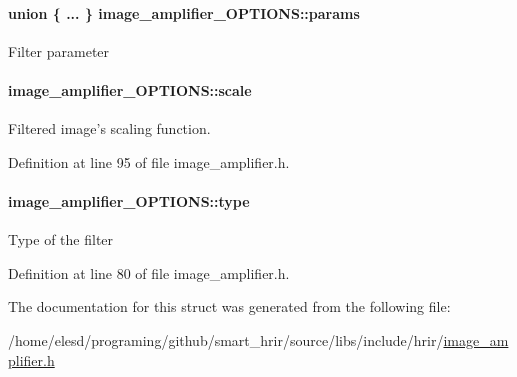 \hypertarget{a00002_ac7c75806a264a52c487659515f68ff31}{
\paragraph[{params}]{\setlength{\rightskip}{0pt plus 5cm}union \{ ... \}   image\-\_\-amplifier\-\_\-\-O\-P\-T\-I\-O\-N\-S\-::params}}\label{a00002_ac7c75806a264a52c487659515f68ff31}
Filter parameter \hypertarget{a00002_a9b180d0032ef65ead5962c570736e423}{
\paragraph[{scale}]{ image\-\_\-amplifier\-\_\-\-O\-P\-T\-I\-O\-N\-S\-::scale}}\label{a00002_a9b180d0032ef65ead5962c570736e423}
Filtered image's scaling function. 

Definition at line 95 of file image\-\_\-amplifier.\-h.

\hypertarget{a00002_a4bc5ec751e2e2013dafc3a6b65e24323}{
\paragraph[{type}]{ image\-\_\-amplifier\-\_\-\-O\-P\-T\-I\-O\-N\-S\-::type}}\label{a00002_a4bc5ec751e2e2013dafc3a6b65e24323}
Type of the filter 

Definition at line 80 of file image\-\_\-amplifier.\-h.



The documentation for this struct was generated from the following file\-:\begin{DoxyCompactItemize}
\item 
/home/elesd/programing/github/smart\-\_\-hrir/source/libs/include/hrir/\hyperlink{a00011}{image\-\_\-amplifier.\-h}\end{DoxyCompactItemize}
